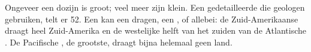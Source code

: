 \begin{remark}\label{rem:g7:plate-tectonics:how-many}
Ongeveer een dozijn  is groot; veel meer zijn klein. Een
gedetailleerde  die geologen gebruiken, telt er 52. Een  kan een
 dragen, een , of allebei: de Zuid-Amerikaanse  draagt
heel Zuid-Amerika en de westelijke helft van het zuiden van de Atlantische
. De Pacifische , de grootste, draagt bijna helemaal geen land.
\end{remark}

